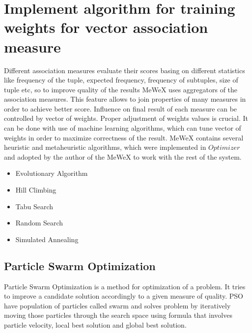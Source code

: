 \chapter{Implement algorithm for training weights for vector association measure}\label{vam_descr}

Different association measures evaluate their scores basing on different statistics like frequency of the tuple, 
expected frequency, frequency of subtuples, size of tuple etc, so to improve quality of the results MeWeX uses 
aggregators of the association measures. This feature allows to join properties of many measures in order to achieve 
better score. Influence on final result of each measure can be controlled by vector of weights. Proper adjustment 
of weights values is crucial. It can be done with use of machine learning algorithms, which can tune vector of weights 
in order to maximize correctness of the result. MeWeX contains several heuristic and metaheuristic algorithms, 
which were implemented in \(Optimizer\)\cite{klyk} and adopted by the author of the MeWeX to work with the rest of the system.
\begin{itemize}
    \setlength\itemsep{0em}
    \item Evolutionary Algorithm 
    \item Hill Climbing 
    \item Tabu Search 
    \item Random Search 
    \item Simulated Annealing
\end{itemize}

\section{Particle Swarm Optimization}\label{pso_def}

Particle Swarm Optimization is a method for optimization of a problem. It tries to improve a candidate solution 
accordingly to a given measure of quality. PSO have population of particles called swarm and solves problem by iteratively moving those particles 
through the search space using formula that involves particle velocity, local best solution and global best solution. 

